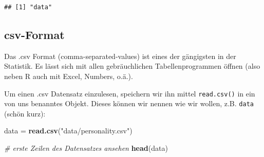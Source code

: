 \documentclass[
]{book}
\newenvironment{Shaded}{\begin{snugshade}}{\end{snugshade}}
\newcommand{\CommentTok}[1]{\textcolor[rgb]{0.56,0.35,0.01}{\textit{#1}}}
\newcommand{\FunctionTok}[1]{\textcolor[rgb]{0.13,0.29,0.53}{\textbf{#1}}}
\newcommand{\NormalTok}[1]{#1}
\newcommand{\OtherTok}[1]{\textcolor[rgb]{0.56,0.35,0.01}{#1}}
\newcommand{\StringTok}[1]{\textcolor[rgb]{0.31,0.60,0.02}{#1}}
\begin{document}
\begin{verbatim}
## [1] "data"
\end{verbatim}

\subsection{csv-Format}\label{csv-format}

Das .csv Format (comma-separated-values) ist eines der gängigsten in der Statistik. Es lässt sich mit allen gebräuchlichen Tabellenprogrammen öffnen (also neben R auch mit Excel, Numbers, o.ä.).

Um einen .csv Datensatz einzulesen, speichern wir ihn mittel \texttt{read.csv()} in ein von uns benanntes Objekt. Dieses können wir nennen wie wir wollen, z.B. \texttt{data} (schön kurz):

\begin{Shaded}
\begin{Highlighting}[]
\NormalTok{data }\OtherTok{=} \FunctionTok{read.csv}\NormalTok{(}\StringTok{"data/personality.csv"}\NormalTok{)}

\CommentTok{\# erste Zeilen des Datensatzes ansehen}
\FunctionTok{head}\NormalTok{(data)}
\end{Highlighting}
\end{Shaded}
\end{document}
